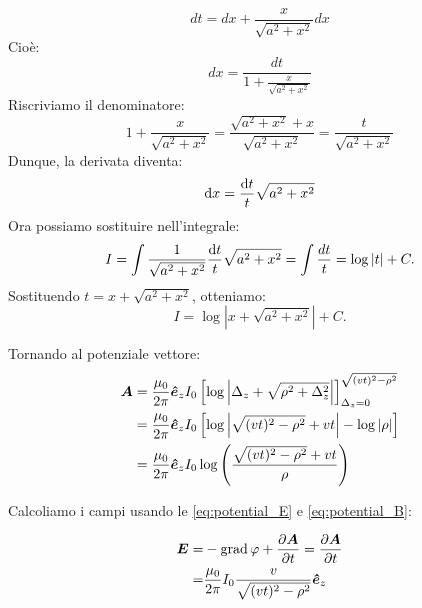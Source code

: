 \begin{Es}
  \[
    dt = dx + \frac{x}{\sqrt{a^2 + x^2}} dx
  \]
  Cioè:
  \[
    dx = \frac{dt}{1 + \frac{x}{\sqrt{a^2 + x^2}}}
  \]
  Riscriviamo il denominatore:
  \[
    1 + \frac{x}{\sqrt{a^2 + x^2}} = \frac{\sqrt{a^2 + x^2} + x}{\sqrt{a^2 + x^2}} = \frac{t}{\sqrt{a^2 + x^2}}
  \]
  Dunque, la derivata diventa:
  \[
    \mathrm{d} x = \frac{\mathrm{d} t}{t} \sqrt{a^2 + x^2}
  \]
  Ora possiamo sostituire nell'integrale:
  \[
    I = \int \frac{1}{\sqrt{a^2+x^2}}\frac{\mathrm{d} t}{t} \sqrt{a^2 + x^2}=\int \frac{dt}{t} = \log |t| + C.
  \]
  Sostituendo \( t = x + \sqrt{a^2 + x^2} \), otteniamo:
  \[
    I = \log |x + \sqrt{a^2 + x^2}| + C.
  \]

  Tornando al potenziale vettore:
  \begin{align*}
    \boldsymbol{A} & = \frac{\mu_0}{2\pi}\boldsymbol{\hat {e}}_z I_0\left[ \log \left|\Delta_z + \sqrt{\rho^2 + \Delta_z^2}\right| \right]_{\Delta_z=0}^{\sqrt{(vt)^2-\rho^2}} \\
          & = \frac{\mu_0}{2\pi}\boldsymbol{\hat {e}}_z I_0\left[ \log \left|\sqrt{(vt)^2-\rho^2} + vt\right| - \log|\rho| \right]                                    \\
          & = \frac{\mu_0}{2\pi}\boldsymbol{\hat {e}}_z I_0\log \left(\frac{\sqrt{(vt)^2-\rho^2} + vt}{\rho}\right)
  \end{align*}

  Calcoliamo i campi usando le \eqref{eq:potential_E} e \eqref{eq:potential_B}:

  \begin{align*}
    \boldsymbol{E} = & -\operatorname{grad}\varphi + \frac{\partial\boldsymbol{A}}{\partial t} = \frac{\partial\boldsymbol{A}}{\partial t} \\
    =       & \frac{\mu_0}{2\pi} I_0\frac{v}{\sqrt{(vt)^2-\rho^2}}\boldsymbol{\hat {e}}_z
  \end{align*}


\end{Es}
